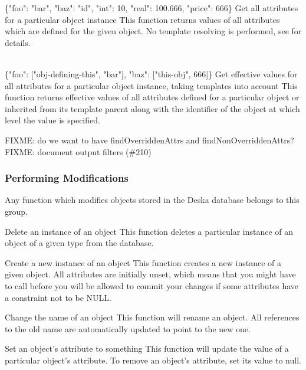 \documentclass{article}
\begin{document}
    {\{"foo": "bar", "baz": "id", "int": 10, "real": 100.666, "price": 666\}}
    {Get all attributes for a particular object instance}
    {This function returns values of all attributes which are defined for the given object.  No template resolving is
    performed, see  for details.}

    {\\ \{"foo": ["obj-defining-this", "bar"], "baz": ["this-obj", 666]\}}
    {Get effective values for all attributes for a particular object instance, taking templates into account}
    {This function returns effective values of all attributes defined for a particular object or inherited from its
    template parent along with the identifier of the object at which level the value is specified.}

FIXME: do we want to have findOverriddenAttrs and findNonOverriddenAttrs?
FIXME: document output filters (\#210)

\subsubsection{Performing Modifications}
\label{sec:api-group-data-modification}

Any function which modifies objects stored in the Deska database belongs to this group.

    {}
    {Delete an instance of an object}
    {This function deletes a particular instance of an object of a given type from the database.}

    {}
    {Create a new instance of an object}
    {This function creates a new instance of a given object.  All attributes are initially unset, which means that you
    might have to call  before you will be allowed to commit your changes if some attributes
    have a constraint not to be NULL.}

    {}
    {Change the name of an object}
    {This function will rename an object.  All references to the old name are automatically updated to point to the new
    one.}

    {}
    {Set an object's attribute to something}
    {This function will update the value of a particular object's attribute.  To remove an object's attribute, set its
    value to null.}
\end{document}
